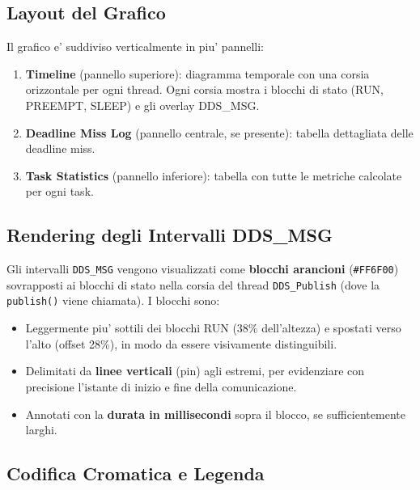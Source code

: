 \subsection{Layout del Grafico}
\label{subsec:layout}

Il grafico e' suddiviso verticalmente in piu' pannelli:

\begin{enumerate}
    \item \textbf{Timeline} (pannello superiore): diagramma temporale con
          una corsia orizzontale per ogni thread. Ogni corsia mostra i
          blocchi di stato (RUN, PREEMPT, SLEEP) e gli overlay DDS\_MSG.
    \item \textbf{Deadline Miss Log} (pannello centrale, se presente):
          tabella dettagliata delle deadline miss.
    \item \textbf{Task Statistics} (pannello inferiore): tabella con tutte
          le metriche calcolate per ogni task.
\end{enumerate}

\subsection{Rendering degli Intervalli DDS\_MSG}
\label{subsec:dds_rendering}

Gli intervalli \texttt{DDS\_MSG} vengono visualizzati come
\textbf{blocchi arancioni} (\texttt{\#FF6F00}) sovrapposti ai blocchi
di stato nella corsia del thread \texttt{DDS\_Publish} (dove la
\texttt{publish()} viene chiamata). I blocchi sono:

\begin{itemize}
    \item Leggermente piu' sottili dei blocchi RUN (38\% dell'altezza)
          e spostati verso l'alto (offset 28\%), in modo da essere
          visivamente distinguibili.
    \item Delimitati da \textbf{linee verticali} (pin) agli estremi,
          per evidenziare con precisione l'istante di inizio e fine
          della comunicazione.
    \item Annotati con la \textbf{durata in millisecondi} sopra il blocco,
          se sufficientemente larghi.
\end{itemize}

\subsection{Codifica Cromatica e Legenda}
\label{subsec:colori}


